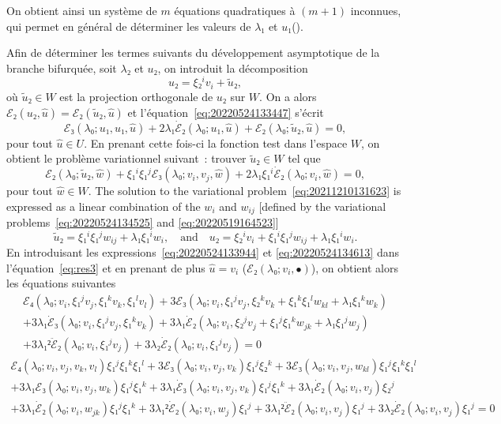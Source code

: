 \documentclass[12pt, final]{scrartcl}
\theoremstyle{definition}
\begin{document}
On obtient ainsi un système de \(m\) équations quadratiques à \((m + 1)\)
inconnues, qui permet en général de déterminer les valeurs de \(λ₁\) et
\(u₁\)().

Afin de déterminer les termes suivants du développement asymptotique de la
branche bifurquée, soit \(λ₂\) et \(u₂\), on introduit la décomposition
\begin{equation}
  u₂ = ξ₂^i v_i + \tilde{u}₂,
\end{equation}
où \(\tilde{u}₂∈W\) est la projection orthogonale de \(u₂\) sur \(W\). On a
alors \(ℰ₂(u₂, \hat{u}) =ℰ₂(\tilde{u}₂, \hat{u})\) et
l'équation~\eqref{eq:20220524133447} s'écrit
\begin{equation}
 ℰ₃(λ₀; u₁, u₁, \hat{u}) + 2λ₁ \dot{ℰ}₂(λ₀; u₁, \hat{u}) + ℰ₂(λ₀; \tilde{u}₂, \hat{u}) = 0,
\end{equation}
pour tout \(\hat{u}∈U\). En prenant cette fois-ci la fonction test dans l'espace
\(W\), on obtient le problème variationnel suivant~: trouver \(\tilde{u}₂∈W\)
tel que
\begin{equation}
  \label{eq:20211210131623}
  ℰ₂(λ₀; \tilde{u}₂, \hat{w}) + ξ₁^i ξ₁^j ℰ₃(λ₀; v_i, v_j, \hat{w}) + 2λ₁ ξ₁^i \dot{ℰ}₂(λ₀; v_i, \hat{w}) = 0,
\end{equation}
pour tout \(\hat{w}∈W\). The solution to the variational
problem~\eqref{eq:20211210131623} is expressed as a linear combination of the
\(w_i\) and \(w_{ij}\) [defined by the variational
problems~\eqref{eq:20220524134525} and \eqref{eq:20220519164523}]
\begin{equation}
  \label{eq:20220524134613}
  \tilde{u}₂ = ξ₁^i ξ₁^j w_{ij} + λ₁ ξ₁^i w_i,
  \quad\text{and}\quad
  u₂ = ξ₂^i v_i + ξ₁^i ξ₁^j w_{ij} + λ₁ ξ₁^i w_i.
\end{equation}
En introduisant les expressions~\eqref{eq:20220524133944} et
\eqref{eq:20220524134613} dans l'équation~\eqref{eq:res3} et en prenant de plus
\(\hat{u} = v_i\) (\(ℰ₂(λ₀; v_i, •)\)), on obtient alors les équations suivantes
\begin{multline*}
  ℰ₄(λ₀; v_i, ξ₁^j v_j, ξ₁^k v_k, ξ₁^l v_l) + 3ℰ₃(λ₀; v_i, ξ₁^j v_j, ξ₂^k v_k + ξ₁^k ξ₁^l w_{kl} + λ₁ ξ₁^k w_k)\\
  + 3λ₁ \dot{ℰ}₃(λ₀; v_i, ξ₁^j v_j, ξ₁^k v_k) + 3λ₁ \dot{ℰ}₂(λ₀; v_i, ξ₂^j v_j + ξ₁^j ξ₁^k w_{jk} + λ₁ ξ₁^j w_j)\\
  + 3λ₁² \ddot{ℰ}₂(λ₀; v_i, ξ₁^j v_j) + 3λ₂ \dot{ℰ}₂(λ₀; v_i, ξ₁^j v_j) = 0
\end{multline*}
\begin{multline*}
  ℰ₄(λ₀; v_i, v_j, v_k, v_l) ξ₁^j ξ₁^k ξ₁^l + 3ℰ₃(λ₀; v_i, v_j, v_k) ξ₁^j ξ₂^k + 3ℰ₃(λ₀; v_i, v_j, w_{kl}) ξ₁^j ξ₁^k ξ₁^l\\
  + 3λ₁ ℰ₃(λ₀; v_i, v_j, w_k) ξ₁^j ξ₁^k + 3λ₁ \dot{ℰ}₃(λ₀; v_i, v_j, v_k) ξ₁^j ξ₁^k + 3λ₁ \dot{ℰ}₂(λ₀; v_i, v_j) ξ₂^j\\
  + 3λ₁ \dot{ℰ}₂(λ₀; v_i, w_{jk}) ξ₁^j ξ₁^k + 3λ₁² \dot{ℰ}₂(λ₀; v_i, w_j) ξ₁^j + 3λ₁² \ddot{ℰ}₂(λ₀; v_i, v_j) ξ₁^j + 3λ₂ \dot{ℰ}₂(λ₀; v_i, v_j) ξ₁^j = 0
\end{multline*}
\end{document}
